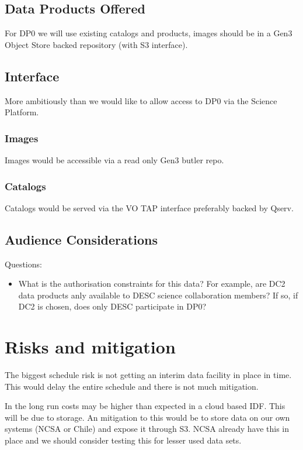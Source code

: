 \subsection{Data Products Offered}



For DP0 we will use existing catalogs and products, images should be in a Gen3 Object Store backed repository (with S3 interface).


\subsection {Interface}
More ambitiously than   we would like to allow access to DP0 via
the Science Platform.
\subsubsection{Images}
Images would be accessible via a read only Gen3 butler repo.
\subsubsection{Catalogs}
Catalogs would be served via the VO TAP interface preferably backed by Qserv.

\subsection{Audience Considerations}

Questions:

\begin{itemize}

\item What is the authorisation constraints for this data? For example, are DC2 data products anly available to DESC science collaboration members? If so, if DC2 is chosen, does only DESC participate in DP0? 
  
\end{itemize}


\section{Risks and mitigation}

The biggest schedule risk is not getting an interim data facility in place in time.
This would delay the entire schedule and there is not much mitigation.

In the long run costs may be higher than expected in a cloud based IDF. This will be due to storage.
An mitigation to this would be to store data on our own systems (NCSA or Chile) and expose it through S3.
NCSA already have this in place and we should consider testing this for lesser used data sets.

